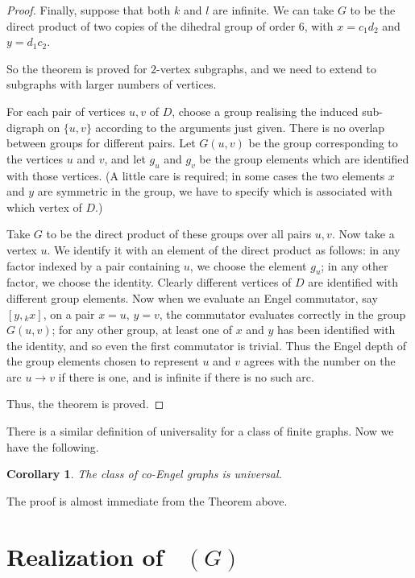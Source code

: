 \documentclass[reqno,12pt]{amsart}
\theoremstyle{plain}
\newtheorem{cor}[thm]{Corollary}
\theoremstyle{definition}
\newcommand{\coeng}{\mathop{\mathcal{E}_c^-}}
\begin{document}
\begin{proof}
Finally, suppose that both $k$ and $l$ are infinite. We can take $G$ to be
the direct product of two copies of the dihedral group of order $6$, with 
$x=c_1d_2$ and $y=d_1c_2$.

\medskip

So the theorem is proved for $2$-vertex subgraphs, and we need to extend to
subgraphs with larger numbers of vertices.

For each pair of vertices $u,v$ of $D$, choose a group realising the induced
sub-digraph on $\{u,v\}$ according to the arguments just given. There is no
overlap between groups for different pairs. Let $G(u,v)$ be the group
corresponding to the vertices $u$ and $v$, and let $g_u$ and $g_v$ be the
group elements which are identified with those vertices. (A little care is
required; in some cases the two elements $x$ and $y$ are symmetric in the
group, we have to specify which is associated with which vertex of $D$.)

Take $G$ to be the direct product of these groups over all pairs $u,v$. Now
take a vertex $u$.  We identify it with an element of the direct product as
follows: in any factor indexed by a pair containing $u$, we choose the element
$g_u$; in any other factor, we choose the identity. Clearly different vertices
of $D$ are identified with different group elements. Now when we evaluate an
Engel commutator, say $[y,{}_kx]$, on a pair $x=u$, $y=v$, the commutator
evaluates correctly in the group $G(u,v)$; for any other group, at least one
of $x$ and $y$ has been identified with the identity, and so even the first
commutator is trivial. Thus the Engel depth of the group elements chosen to
represent $u$ and $v$ agrees with the number on the arc $u\to v$ if there is
one, and is infinite if there is no such arc.

Thus, the theorem is proved.
\end{proof}

There is a similar definition of universality for a class of finite graphs. Now
we have the following.

\begin{cor}
The class of co-Engel graphs is universal.
\end{cor}

The proof is almost immediate from the Theorem above.

\section{Realization  of  $\coeng(G)$}\label{s:next}
\end{document}
